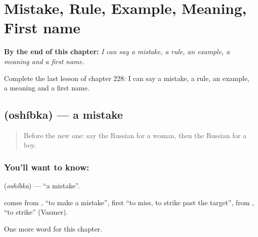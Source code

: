 
\chapter{Mistake, Rule, Example, Meaning, First name}
\label{ch:ru-mistake-rule-example-meaning-first-name}

\begin{chapteropening}
\textbf{By the end of this chapter:} \emph{I can say a mistake, a rule, an example, a meaning and a first name.}

Complete the last lesson of chapter 228: I can say a mistake, a rule, an example, a meaning and a first name.
\end{chapteropening}

\section[\texorpdfstring{\ru{ошибка} (oshíbka)}{ошибка (oshíbka)}]{ (oshíbka) — a mistake}

\label{lesson:RU-C228-oshibka}



\begin{quote}
Before the new one: say the Russian for a woman, then the Russian for a boy.
\end{quote}

\subsection*{You'll want to know: }
\textbf{} (\emph{oshíbka}) — \textquotedblleft{}a mistake\textquotedblright{}.

\begin{cousinweb}
\textbf{} comes from \emph{}, \textquotedblleft{}to make a mistake\textquotedblright{}, first \textquotedblleft{}to miss, to strike past the target\textquotedblright{}, from \emph{}, \textquotedblleft{}to strike\textquotedblright{} (Vasmer).
\end{cousinweb}

\begin{grammarlens}[title={What you've built}]
One more word for this chapter.
\end{grammarlens}

